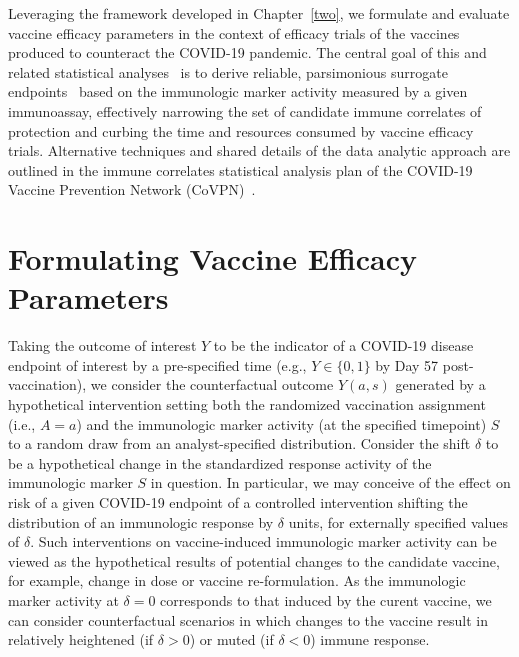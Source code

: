 Leveraging the framework developed in Chapter~\ref{two}, we formulate and
evaluate vaccine efficacy parameters in the context of efficacy trials of the
vaccines produced to counteract the COVID-19 pandemic. The central goal of this
and related statistical analyses~\citep[e.g.,][]{benkeser2021inference,
gilbert2021assessment} is to derive reliable, parsimonious surrogate
endpoints~\citep{prentice1989surrogate, gilbert2008evaluating} based on the
immunologic marker activity measured by a given immunoassay, effectively
narrowing the set of candidate immune correlates of protection and curbing the
time and resources consumed by vaccine efficacy trials. Alternative techniques
and shared details of the data analytic approach are outlined in the immune
correlates statistical analysis plan of the COVID-19 Vaccine Prevention Network
(CoVPN)~\citep{gilbert2021covpn}.

\section{Formulating Vaccine Efficacy Parameters}

Taking the outcome of interest $Y$ to be the indicator of a COVID-19 disease
endpoint of interest by a pre-specified time (e.g., $Y \in \{0, 1\}$ by Day 57
post-vaccination), we consider the counterfactual outcome $Y(a,s)$ generated by
a hypothetical intervention setting both the randomized vaccination assignment
(i.e., $A = a$) and the immunologic marker activity (at the specified timepoint)
$S$ to a random draw from an analyst-specified distribution. Consider the shift
$\delta$ to be a hypothetical change in the standardized response activity of
the immunologic marker $S$ in question. In particular, we may conceive of the
effect on risk of a given COVID-19 endpoint of a controlled intervention
shifting the distribution of an immunologic response by $\delta$ units, for
externally specified values of $\delta$. Such interventions on vaccine-induced
immunologic marker activity can be viewed as the hypothetical results of
potential changes to the candidate vaccine, for example, change in dose or
vaccine re-formulation. As the immunologic marker activity at $\delta = 0$
corresponds to that induced by the curent vaccine, we can consider
counterfactual scenarios in which changes to the vaccine result in relatively
heightened (if $\delta > 0$) or muted (if $\delta < 0$) immune response.

